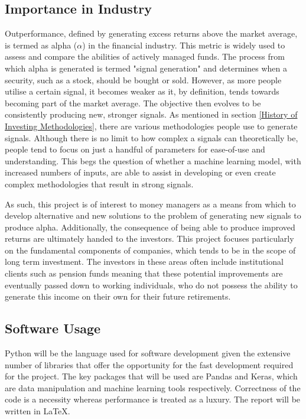 \documentclass[10pt,onecolumn,letterpaper]{article}
\begin{document}
\subsection{Importance in Industry} 

Outperformance, defined by generating excess returns above the market average, is termed as alpha ($\alpha$) in the financial industry. This metric is widely used to assess and compare the abilities of actively managed funds. The process from which alpha is generated is termed "signal generation" and determines when a security, such as a stock, should be bought or sold. However, as more people utilise a certain signal, it becomes weaker as it, by definition, tends towards becoming part of the market average. The objective then evolves to be consistently producing new, stronger signals. As mentioned in section \ref{History of Investing Methodologies}, there are various methodologies people use to generate signals. Although there is no limit to how complex a signals can theoretically be, people tend to focus on just a handful of parameters for ease-of-use and understanding. This begs the question of whether a machine learning model, with increased numbers of inputs, are able to assist in developing or even create complex methodologies that result in strong signals.  

As such, this project is of interest to money managers as a means from which to develop alternative and new solutions to the problem of generating new signals to produce alpha. Additionally, the consequence of being able to produce improved returns are ultimately handed to the investors. This project focuses particularly on the fundamental components of companies, which tends to be in the scope of long term investment. The investors in these areas often include institutional clients such as pension funds meaning that these potential improvements are eventually passed down to working individuals, who do not possess the ability to generate this income on their own for their future retirements.  

\subsection{Software Usage} 

Python will be the language used for software development given the extensive number of libraries that offer the opportunity for the fast development required for the project. The key packages that will be used are Pandas and Keras, which are data manipulation and machine learning tools respectively. Correctness of the code is a necessity whereas performance is treated as a luxury. The report will be written in LaTeX. 
\end{document}
